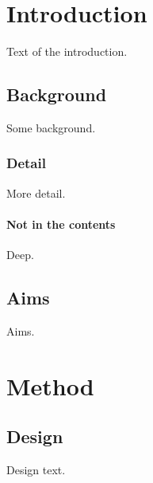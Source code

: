 \documentclass{report}
\begin{document}
\tableofcontents
\chapter{Introduction}
Text of the introduction.
\section{Background}
Some background.
\subsection{Detail}
More detail.
\subsubsection{Not in the contents}
Deep.
\section{Aims}
Aims.
\chapter{Method}
\section{Design}
Design text.
\end{document}
